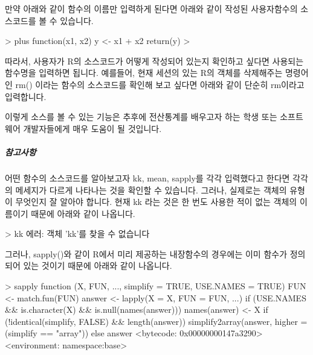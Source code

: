 만약 아래와 같이 함수의 이름만 입력하게 된다면 아래와 같이 작성된 사용자함수의 소스코드를 볼 수 있습니다. 

\begin{Schunk}
\begin{Soutput}
> plus
function(x1, x2){
y <- x1 + x2
return(y)
}
> 
\end{Soutput}
\end{Schunk}

따라서, 사용자가 R의 소스코드가 어떻게 작성되어 있는지 확인하고 싶다면 사용되는 함수명을 입력하면 됩니다. 
예를들어, 현재 세션의 있는 R의 객체를 삭제해주는 명령어인 rm() 이라는 함수의 소스코드를 확인해 보고 싶다면 아래와 같이 단순히 rm이라고 입력합니다.

\begin{Schunk}
\end{Schunk}

이렇게 소스를 볼 수 있는 기능은 추후에 전산통계를 배우고자 하는 학생 또는 소프트웨어 개발자들에게 매우 도움이 될 것입니다. 

\subparagraph{참고사항}
어떤 함수의 소스코드를 알아보고자 kk, mean, sapply를 각각 입력했다고 한다면 각각의 메세지가 다르게 나타나는 것을 확인할 수 있습니다.
그러나, 실제로는 객체의 유형이 무엇인지 잘 알아야 합니다. 
현재 kk 라는 것은 한 번도 사용한 적이 없는 객체의 이름이기 때문에 아래와 같이 나옵니다. 

\begin{Schunk}
\begin{Soutput}
> kk
에러: 객체 'kk'를 찾을 수 없습니다
\end{Soutput}
\end{Schunk}

그러나, sapply()와 같이 R에서 미리 제공하는 내장함수의 경우에는 이미 함수가 정의되어 있는 것이기 때문에 아래와 같이 나옵니다. 

\begin{Schunk}
\begin{Soutput}
> sapply
function (X, FUN, ..., simplify = TRUE, USE.NAMES = TRUE) 
{
   FUN <- match.fun(FUN)
   answer <- lapply(X = X, FUN = FUN, ...)
   if (USE.NAMES && is.character(X) && is.null(names(answer))) 
       names(answer) <- X
   if (!identical(simplify, FALSE) && length(answer)) 
       simplify2array(answer, higher = (simplify == "array"))
   else answer
}
<bytecode: 0x00000000147a3290>
<environment: namespace:base>
\end{Soutput}
\end{Schunk}


